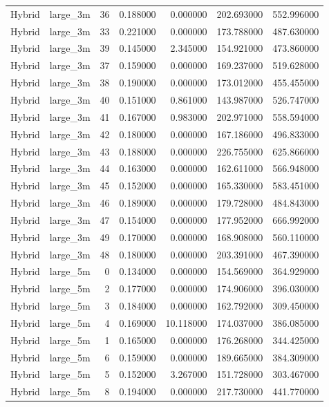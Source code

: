 \begin{tabular}{llrrrrr}
Hybrid & large_3m & 36 & 0.188000 & 0.000000 & 202.693000 & 552.996000 \\
Hybrid & large_3m & 33 & 0.221000 & 0.000000 & 173.788000 & 487.630000 \\
Hybrid & large_3m & 39 & 0.145000 & 2.345000 & 154.921000 & 473.860000 \\
Hybrid & large_3m & 37 & 0.159000 & 0.000000 & 169.237000 & 519.628000 \\
Hybrid & large_3m & 38 & 0.190000 & 0.000000 & 173.012000 & 455.455000 \\
Hybrid & large_3m & 40 & 0.151000 & 0.861000 & 143.987000 & 526.747000 \\
Hybrid & large_3m & 41 & 0.167000 & 0.983000 & 202.971000 & 558.594000 \\
Hybrid & large_3m & 42 & 0.180000 & 0.000000 & 167.186000 & 496.833000 \\
Hybrid & large_3m & 43 & 0.188000 & 0.000000 & 226.755000 & 625.866000 \\
Hybrid & large_3m & 44 & 0.163000 & 0.000000 & 162.611000 & 566.948000 \\
Hybrid & large_3m & 45 & 0.152000 & 0.000000 & 165.330000 & 583.451000 \\
Hybrid & large_3m & 46 & 0.189000 & 0.000000 & 179.728000 & 484.843000 \\
Hybrid & large_3m & 47 & 0.154000 & 0.000000 & 177.952000 & 666.992000 \\
Hybrid & large_3m & 49 & 0.170000 & 0.000000 & 168.908000 & 560.110000 \\
Hybrid & large_3m & 48 & 0.180000 & 0.000000 & 203.391000 & 467.390000 \\
Hybrid & large_5m & 0 & 0.134000 & 0.000000 & 154.569000 & 364.929000 \\
Hybrid & large_5m & 2 & 0.177000 & 0.000000 & 174.906000 & 396.030000 \\
Hybrid & large_5m & 3 & 0.184000 & 0.000000 & 162.792000 & 309.450000 \\
Hybrid & large_5m & 4 & 0.169000 & 10.118000 & 174.037000 & 386.085000 \\
Hybrid & large_5m & 1 & 0.165000 & 0.000000 & 176.268000 & 344.425000 \\
Hybrid & large_5m & 6 & 0.159000 & 0.000000 & 189.665000 & 384.309000 \\
Hybrid & large_5m & 5 & 0.152000 & 3.267000 & 151.728000 & 303.467000 \\
Hybrid & large_5m & 8 & 0.194000 & 0.000000 & 217.730000 & 441.770000 \\

\end{tabular}
